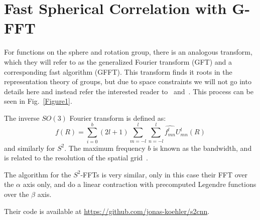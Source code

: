 \documentclass[10pt,twocolumn,letterpaper]{article}
\begin{document}
\section{Fast Spherical Correlation with G-FFT}
For functions on the sphere and rotation group, there is an analogous transform, which they will refer to as the generalized Fourier transform (GFT) and a corresponding fast algorithm (GFFT). This transform finds it roots in the representation theory of groups, but due to space constraints we will not go into details here and instead refer the interested reader to~\cite{name4} and~\cite{name3}. This process can be seen in Fig.~\ref{Figure1}.
\par The inverse $SO(3)$ Fourier transform is defined as:
\begin{equation}
f(R)=\sum_{i=0}^{b}(2l+1)\sum_{m=-l}^{l}\sum_{n=-l}^{l}\hat{f_{mn}^{l}}U_{mn}^{l}(R)
\end{equation}
and similarly for $S^2$. The maximum frequency $b$ is known as the bandwidth, and is related to the resolution of the spatial grid~\cite{name5}.
\par The algorithm for the $S^2$-FFTs is very similar, only in this case their FFT over the $\alpha$ axis only, and do a linear contraction with precomputed Legendre functions over the $\beta$ axis.
\par Their code is available at \url{https://github.com/jonas-koehler/s2cnn}.


\end{document}
